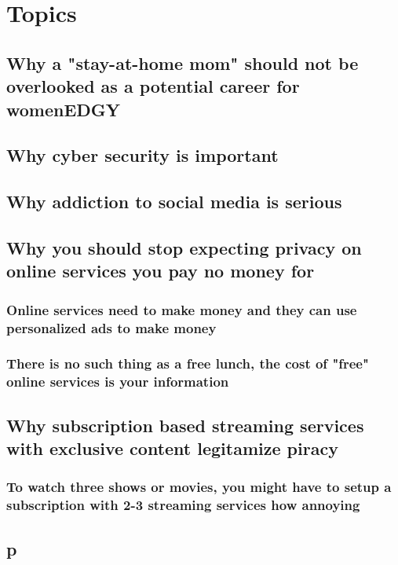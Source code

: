 \documentclass[11pt]{article}
\date{\today}
\title{}
\begin{document}
\tableofcontents


\section{Topics}
\label{sec:org3285537}
\subsection{Why a "stay-at-home mom" should not be overlooked as a potential career for women\hfill{}\textsc{EDGY}}
\label{sec:org240cf5d}
\subsection{Why cyber security is important}
\label{sec:orgecc0a11}
\subsection{Why addiction to social media is serious}
\label{sec:org3b1a22f}
\subsection{Why you should stop expecting privacy on online services you pay no money for}
\label{sec:org72f798e}
\subsubsection{Online services need to make money and they can use personalized ads to make money}
\label{sec:org89a13d4}
\subsubsection{There is no such thing as a free lunch, the cost of "free" online services is your information}
\label{sec:orga4c6d13}
\subsection{Why subscription based streaming services with exclusive content legitamize piracy}
\label{sec:orgef27f28}
\subsubsection{To watch three shows or movies, you might have to setup a subscription with 2-3 streaming services how annoying}
\label{sec:org9f99b01}
\subsection{p}
\label{sec:org82ce0e9}
\end{document}
